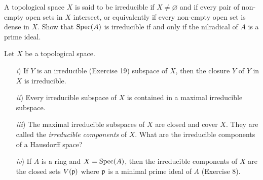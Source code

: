 \documentclass[10pt]{amsart}
\begin{document}
\begin{exercise}
    A topological space $X$ is said to be irreducible if $X \ne \varnothing$ and if every pair 
    of non-empty open sets in $X$ intersect, or equivalently if every non-empty open set is dense in $X$. 
    Show that $\operatorname{Spec}(A)$ is irreducible if and only if the nilradical of $A$ is a prime ideal.
\end{exercise}

\begin{exercise}
    Let $X$ be a topological space.
    \begin{itemize}
        \item[\emph{i})] If $Y$ is an irreducible (Exercise 19) subspace of $X$, then the closure $\overline{Y}$ of $Y$
        in $X$ is irreducible.
        \item[\emph{ii})] Every irreducible subspace of $X$ is contained in a maximal irreducible
        subspace.
        \item[\emph{iii})] The maximal irreducible subspaces of $X$ are closed and cover $X$. They are
        called the \emph{irreducible components} of $X$. What are the irreducible components
        of a Hausdorff space?
        \item[\emph{iv})] If $A$ is a ring and $X = \operatorname{Spec}(A)$, then the irreducible components of $X$ are
        the closed sets $V(\mathfrak{p})$ where $\mathfrak{p}$ is a minimal prime ideal of $A$ (Exercise 8).
    \end{itemize}
\end{exercise}
\end{document}
